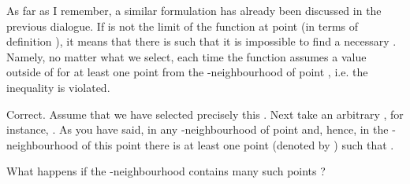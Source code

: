 \begin{s}
As far as I remember, a similar formulation has already been discussed in the previous dialogue. If  is not the limit of the function  at point  (in terms of definition ), it means that there is  such that it is impossible to find a necessary . Namely, no matter what \hlm{$\delta$} we select, each time the function  assumes a value outside of \hlm{$]b - \varepsilon', \, b + \varepsilon'[$} for at least one point  from the \hlm{$\delta$}-neighbourhood of point , i.e. the inequality  is violated.
\end{s}

\begin{p}
Correct. Assume that we have selected precisely this . Next take an arbitrary , for instance, . As you have said, in any \hlm{$\delta$}-neighbourhood of point  and, hence, in the \hlm{$\delta$}-neighbourhood of this point there is at least one point  (denoted by ) such that .
\end{p}

\begin{s}
What happens if the \hlm{$\delta$}-neighbourhood contains many such points ?
\end{s} 


